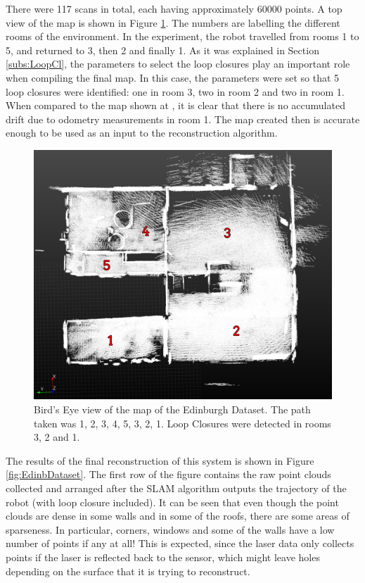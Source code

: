 \documentclass[11pt]{article}
\begin{document}
There were 117 scans in total, each having approximately 60000 points. A top view of the map is shown in Figure \ref{fig:TopViewEdinDataset}. The numbers are labelling the different rooms of the environment. In the experiment, the robot travelled from rooms 1 to 5, and returned to 3, then 2 and finally 1. As it was explained in Section \ref{subs:LoopCl}, the parameters to select the loop closures play an important role when compiling the final map. In this case, the parameters were set so that 5 loop closures were identified: one in room 3, two in room 2 and two in room 1. When compared to the map shown at \cite{AICPAlign}, it is clear that there is no accumulated drift due to odometry measurements in room 1. The map created then is accurate enough to be used as an input to the reconstruction algorithm.
	
\begin{figure}
\centering
\includegraphics[width=0.8\linewidth]{Maps1/TopViewMarked}
\caption{Bird's Eye view of the map of the Edinburgh Dataset. The path taken was 1, 2, 3, 4, 5, 3, 2, 1. Loop Closures were detected in rooms 3, 2 and 1.}
\label{fig:TopViewEdinDataset}
\end{figure}
	
The results of the final reconstruction of this system is shown in Figure \ref{fig:EdinbDataset}. The first row of the figure contains the raw point clouds collected and arranged after the SLAM algorithm outputs the trajectory of the robot (with loop closure included). It can be seen that even though the point clouds are dense in some walls and in some of the roofs, there are some areas of sparseness. In particular, corners, windows and some of the walls have a low number of points if any at all! This is expected, since the laser data only collects points if the laser is reflected back to the sensor, which might leave holes depending on the surface that it is trying to reconstruct.
	
\end{document}
